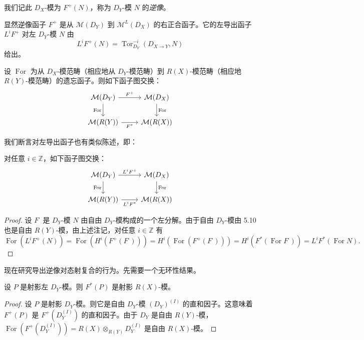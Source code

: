 我们记此 $D_X$-模为 $F^+(N)$，称为 $D_Y$-模 $N$ 的\emph{逆像}。

显然逆像函子 $F^+$ 是从 $\mathcal{M}(D_Y)$ 到 $\mathcal{M}^L(D_X)$ 的右正合函子。它的左导出函子 $L^iF^+$ 对左 $D_Y$-模 $N$ 由
$$L^iF^+(N)=\operatorname{Tor}^{-i}_{D_Y}(D_{X\to Y},N)$$
给出。

设 $\operatorname{For}$ 为从 $D_X$-模范畴（相应地从 $D_Y$-模范畴）到 $R(X)$-模范畴（相应地 $R(Y)$-模范畴）的遗忘函子。则如下函子图交换：
$$\begin{tikzcd}
\mathcal{M}(D_Y) \arrow[r,"F^+"] \arrow[d,"\operatorname{For}"'] & \mathcal{M}(D_X) \arrow[d,"\operatorname{For}"]\\
\mathcal{M}(R(Y)) \arrow[r,"F^*"'] & \mathcal{M}(R(X))
\end{tikzcd}$$

我们断言对左导出函子也有类似陈述，即：

\begin{proposition}
对任意 $i\in\mathbb{Z}$，如下函子图交换：
$$\begin{tikzcd}
\mathcal{M}(D_Y) \arrow[r,"L^iF^+"] \arrow[d,"\operatorname{For}"'] & \mathcal{M}(D_X) \arrow[d,"\operatorname{For}"]\\
\mathcal{M}(R(Y)) \arrow[r,"L^iF^*"'] & \mathcal{M}(R(X))
\end{tikzcd}$$
\end{proposition}

\begin{proof}
设 $F^\cdot$ 是 $D_Y$-模 $N$ 由自由 $D_Y$-模构成的一个左分解。由于自由 $D_Y$-模由 5.10 也是自由 $R(Y)$-模，由上述注记，对任意 $i\in\mathbb{Z}$ 有
$$\operatorname{For}(L^iF^+(N))=\operatorname{For}(H^i(F^+(F^\cdot)))=H^i(\operatorname{For}(F^+(F^\cdot)))=H^i(F^*(\operatorname{For}F^\cdot))=L^iF^*(\operatorname{For}N).$$
\end{proof}

现在研究导出逆像对态射复合的行为。先需要一个无环性结果。

\begin{lemma}
设 $P$ 是射影左 $D_Y$-模。则 $F^*(P)$ 是射影 $R(X)$-模。
\end{lemma}

\begin{proof}
设 $P$ 是射影 $D_Y$-模。则它是自由 $D_Y$-模 $(D_Y)^{(I)}$ 的直和因子。这意味着 $F^+(P)$ 是 $F^+(D_Y^{(I)})$ 的直和因子。由于 $D_Y$ 是自由 $R(Y)$-模，$\operatorname{For}(F^+(D_Y^{(I)}))=R(X)\otimes_{R(Y)}D_Y^{(I)}$ 是自由 $R(X)$-模。
\end{proof}

